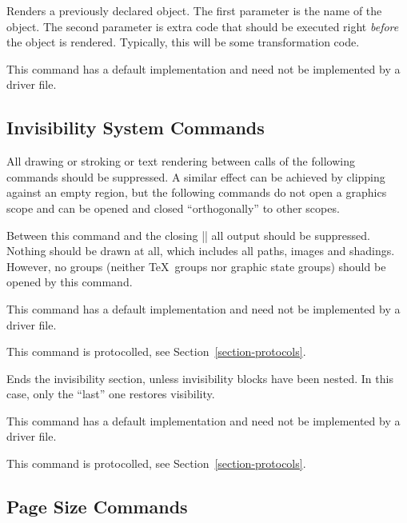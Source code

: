 \begin{command}{\pgfsys@useobject{}}
  Renders a previously declared object. The first parameter is the
  name of the object. The second parameter is extra code that
  should be executed right \emph{before} the object is
  rendered. Typically, this will be some transformation code.

  This command has a default implementation and need not be
  implemented by a driver file.
\end{command}


\subsection{Invisibility System Commands}

All drawing or stroking or text rendering between calls of the
following commands should be suppressed. A similar effect can be
achieved by clipping against an empty region, but the following
commands do not open a graphics scope and can be opened and closed
``orthogonally'' to other scopes.

\begin{command}{\pgfsys@begininvisible}
  Between this command and the closing |\pgfsys@endinvisible| all
  output should be suppressed. Nothing should be drawn at all, which
  includes all paths, images and shadings. However, no groups (neither
  \TeX\ groups nor graphic state groups) should be opened by this
  command.

  This command has a default implementation and need not be
  implemented by a driver file.

  This command is protocolled, see Section~\ref{section-protocols}.
\end{command}

\begin{command}{\pgfsys@endinvisible}
  Ends the invisibility section, unless invisibility blocks have been
  nested. In this case, only the ``last'' one restores visibility.

  This command has a default implementation and need not be
  implemented by a driver file.

  This command is protocolled, see Section~\ref{section-protocols}.
\end{command}



\subsection{Page Size Commands}

